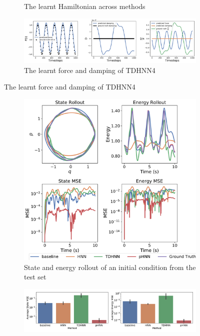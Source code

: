 \documentclass[twoside]{article}
\begin{document}
\begin{figure}[!htb]
\begin{subfigure}[b]{0.48\textwidth}
\caption{The learnt Hamiltonian across methods}
\end{subfigure}
\begin{subfigure}[b]{0.48\textwidth}
\includegraphics[width=\textwidth]{figures/figures/forced_mass_spring/1/forced_mass_spring_dpdt_0.pdf}
\caption{The learnt force and damping of TDHNN4}
\end{subfigure}
\label{forced_mspring_1_full}
\end{figure}
\begin{figure}[!htb]
\centering
\captionsetup{justification=centering}
\begin{subfigure}[b]{0.48\textwidth}
\includegraphics[width=\textwidth]{figures/figures/forced_mass_spring/2/forced_mass_spring_long_0.pdf}
\caption{State and energy rollout of an initial condition from the test set}
\end{subfigure}
\begin{subfigure}[b]{0.48\textwidth}
\includegraphics[width=\textwidth]{figures/figures/forced_mass_spring/2/forced_mass_spring_errors_0.pdf}

\end{subfigure}
\end{figure}
\end{document}
